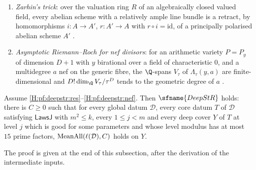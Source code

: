 \begin{hypothesis}
\begin{enumerate}[label=(H\arabic*)]
$v(p)<1$, whose valuation ring $\OO$ is $p$-adically complete, a $p$-divisible group $G$ over $\OO$, a
compatible system $(\zeta_n)$ of $p$-power roots of unity with $\zeta_1\ne1$, and the $\OO$-bilinear form on
$(T_pG\otimes\OO)\times(T_pG^D\otimes\OO)$ induced by the Weil pairing: an element lies in the kernel of the
Hodge--Tate map $\alpha_G\otimes\OO$ if and only if it is orthogonal to the kernel of the dual map
$\mathrm{dlog}$ \cite{Faltings1988,FarguesGenestierLafforgue2008}.
\item\label{H:pf:deepstr:zar} \emph{Zarhin's trick}: over the valuation ring $R$ of an algebraically closed
valued field, every abelian scheme with a relatively ample line bundle is a retract, by homomorphisms
$i\colon A\to A'$, $r\colon A'\to A$ with $r\circ i=\mathrm{id}$, of a principally polarised abelian scheme $A'$
\cite{Zarhin1975,Zarhin1985}.
\item\label{H:pf:deepstr:nef} \emph{Asymptotic Riemann--Roch for nef divisors}: for an arithmetic variety
$P=P_y$ of dimension $D+1$ with $y$ birational over a field of characteristic $0$, and a multidegree $a$ nef on
the generic fibre, the $\Q$-spans $V_\tau$ of $\Lambda_\tau(y,a)$ are finite-dimensional and
$D!\dim_\Q V_\tau/\tau^D$ tends to the geometric degree of $a$ \cite{Lazarsfeld2004}.
\end{enumerate}
\end{hypothesis}

\begin{theorem}\label{pf:deepstr:main}
Assume \ref{H:pf:deepstr:res}--\ref{H:pf:deepstr:nef}. Then $\sfname{DeepStR}$ holds: there is $C\ge0$ such
that for every global datum $\mathcal D$, every core datum $T$ of $\mathcal D$ satisfying $\mathsf{LawsJ}$ with
$m^2\le k$, every $1\le j<m$ and every deep cover $Y$ of $T$ at level $j$ which is good for some parameters
and whose level modulus has at most $15$ prime factors, $\operatorname{MeanAll}(\ell(\mathcal D),C)$ holds on $Y$.
\end{theorem}

The proof is given at the end of this subsection, after the derivation of the intermediate inputs.

